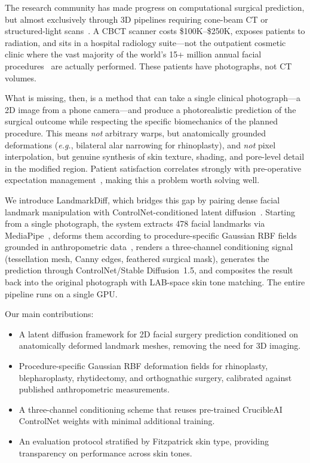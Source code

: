 \documentclass[runningheads]{llncs}
\newcommand{\method}{LandmarkDiff}
\newcommand{\eg}{\textit{e.g.}}
\begin{document}
The research community has made progress on computational surgical
prediction, but almost exclusively through 3D pipelines requiring
cone-beam CT or structured-light scans~\cite{ma2021fcnet,fang2022acmtnet,lee2025camos}.  A CBCT scanner costs \$100K--\$250K,
exposes patients to radiation, and sits in a hospital radiology suite---not
the outpatient cosmetic clinic where the vast majority of the world's 15+
million annual facial procedures~\cite{isaps2023} are actually performed.
These patients have photographs, not CT volumes.

What is missing, then, is a method that can take a single clinical
photograph---a 2D image from a phone camera---and produce a photorealistic
prediction of the surgical outcome while respecting the specific
biomechanics of the planned procedure.  This means \emph{not} arbitrary
warps, but anatomically grounded deformations (\eg, bilateral alar
narrowing for rhinoplasty), and \emph{not} pixel interpolation, but
genuine synthesis of skin texture, shading, and pore-level detail in the
modified region.  Patient satisfaction correlates strongly with
pre-operative expectation management~\cite{honigman2004review}, making
this a problem worth solving well.

We introduce \method{}, which bridges this gap by pairing dense facial
landmark manipulation with ControlNet-conditioned latent
diffusion~\cite{zhang2023controlnet,rombach2022ldm}.  Starting from a
single photograph, the system extracts 478 facial landmarks via
MediaPipe~\cite{lugaresi2019mediapipe}, deforms them according to
procedure-specific Gaussian RBF fields grounded in anthropometric
data~\cite{singh2010plastic}, renders a three-channel conditioning signal
(tessellation mesh, Canny edges, feathered surgical mask), generates the
prediction through ControlNet/Stable Diffusion~1.5, and composites the
result back into the original photograph with LAB-space skin tone
matching.  The entire pipeline runs on a single GPU.

Our main contributions:
\begin{itemize}
    \item A latent diffusion framework for 2D facial surgery prediction
    conditioned on anatomically deformed landmark meshes, removing
    the need for 3D imaging.
    \item Procedure-specific Gaussian RBF deformation fields for
    rhinoplasty, blepharoplasty, rhytidectomy, and orthognathic surgery,
    calibrated against published anthropometric measurements.
    \item A three-channel conditioning scheme that reuses pre-trained
    CrucibleAI ControlNet weights with minimal additional training.
    \item An evaluation protocol stratified by Fitzpatrick skin type,
    providing transparency on performance across skin tones.
\end{itemize}
\end{document}

